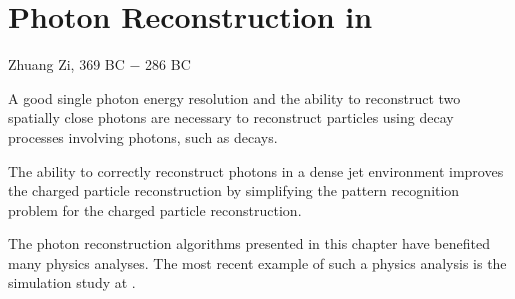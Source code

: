 \chapter{Photon Reconstruction in \pandora}
\label{chap:Photon}

%
{Zhuang Zi, 369 BC $-$ 286 BC}

A good single photon energy resolution and the ability to reconstruct two spatially close photons are necessary to reconstruct particles using decay processes involving photons, such as \HepProcess{\Ppizero\to\Pgamma\Pgamma} decays.



The ability to correctly reconstruct photons in a dense jet environment improves the charged particle reconstruction by simplifying the  pattern recognition problem for the charged particle reconstruction.


The photon reconstruction algorithms presented in this chapter have benefited many physics analyses. The most recent example of such a physics analysis is the  \HepProcess{\PHiggs \to \Pgamma \Pgamma} simulation study at  \CLIC \cite{Kacarevic:higgsToGammaGamma}.

